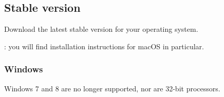 \subsection{Stable version\label{start-install-stable}}

Download the latest stable version for your operating system.

\noindent
\Note{}: you will find installation instructions for macOS in particular.

\subsubsection{Windows\label{start-install-stable-windows}}

Windows 7 and 8 are no longer supported, nor are 32-bit processors.

